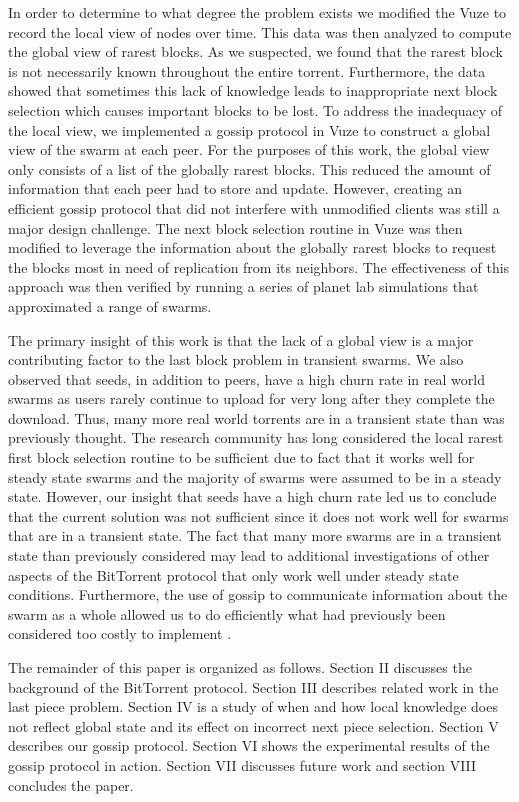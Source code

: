 In order to determine to what degree the problem exists we modified the
Vuze to record the local view of nodes over time. This data was then
analyzed to compute the global view of rarest blocks. As we suspected,
we found that the rarest block is not necessarily known throughout the
entire torrent. Furthermore, the data showed that sometimes this lack
of knowledge leads to inappropriate next block selection which causes
important blocks to be lost. To address the inadequacy of the local view,
we implemented a gossip protocol in Vuze to construct a global view of
the swarm at each peer. For the purposes of this work, the global view
only consists of a list of the globally rarest blocks. This reduced the
amount of information that each peer had to store and update. However,
creating an efficient gossip protocol that did not interfere with
unmodified clients was still a major design challenge. The next block
selection routine in Vuze was then modified to leverage the information
about the globally rarest blocks to request the blocks most in need
of replication from its neighbors. The effectiveness of this approach
was then verified by running a series of planet lab simulations that
approximated a range of swarms.


The primary insight of this work is that the lack of a global view
is a major contributing factor to the last block problem in transient
swarms. We also observed that seeds, in addition to peers, have a high
churn rate in real world swarms as users rarely continue to upload for
very long after they complete the download. Thus, many more real world
torrents are in a transient state than was previously thought. The
research community has long considered the local rarest first block
selection routine to be sufficient due to fact that it works well for
steady state swarms and the majority of swarms were assumed to be in
a steady state. However, our insight that seeds have a high churn rate
led us to conclude that the current solution was not sufficient since
it does not work well for swarms that are in a transient state. The fact
that many more swarms are in a transient state than previously considered
may lead to additional investigations of other aspects of the BitTorrent
protocol that only work well under steady state conditions. Furthermore,
the use of gossip to communicate information about the swarm as a whole
allowed us to do efficiently what had previously been considered too
costly to implement \cite{cohen:1}.


The remainder of this paper is organized as follows. Section II discusses
the background of the BitTorrent protocol. Section III describes related
work in the last piece problem. Section IV is a study of when and how
local knowledge does not reflect global state and its effect on incorrect
next piece selection. Section V describes our gossip protocol. Section VI
shows the experimental results of the gossip protocol in action. Section
VII discusses future work and section VIII concludes the paper.
